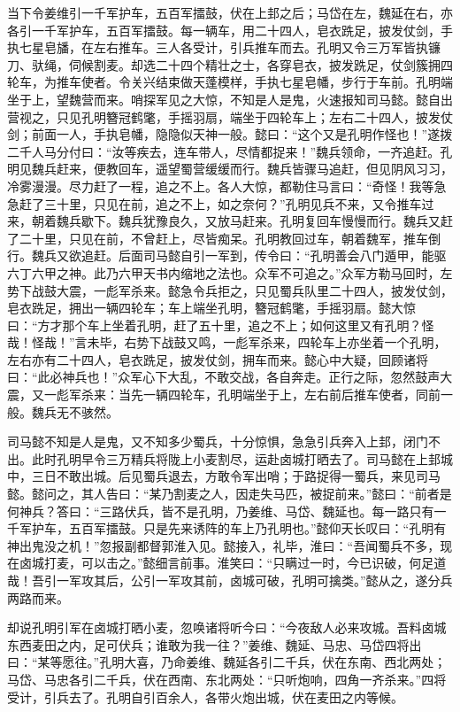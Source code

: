当下令姜维引一千军护车，五百军擂鼓，伏在上邽之后；马岱在左，魏延在右，亦各引一千军护车，五百军擂鼓。每一辆车，用二十四人，皂衣跣足，披发仗剑，手执七星皂旙，在左右推车。三人各受计，引兵推车而去。孔明又令三万军皆执镰刀、驮绳，伺候割麦。却选二十四个精壮之士，各穿皂衣，披发跣足，仗剑簇拥四轮车，为推车使者。令关兴结束做天蓬模样，手执七星皂幡，步行于车前。孔明端坐于上，望魏营而来。哨探军见之大惊，不知是人是鬼，火速报知司马懿。懿自出营视之，只见孔明簪冠鹤氅，手摇羽扇，端坐于四轮车上；左右二十四人，披发仗剑；前面一人，手执皂幡，隐隐似天神一般。懿曰：“这个又是孔明作怪也！”遂拨二千人马分付曰：“汝等疾去，连车带人，尽情都捉来！”魏兵领命，一齐追赶。孔明见魏兵赶来，便教回车，遥望蜀营缓缓而行。魏兵皆骤马追赶，但见阴风习习，冷雾漫漫。尽力赶了一程，追之不上。各人大惊，都勒住马言曰：“奇怪！我等急急赶了三十里，只见在前，追之不上，如之奈何？”孔明见兵不来，又令推车过来，朝着魏兵歇下。魏兵犹豫良久，又放马赶来。孔明复回车慢慢而行。魏兵又赶了二十里，只见在前，不曾赶上，尽皆痴呆。孔明教回过车，朝着魏军，推车倒行。魏兵又欲追赶。后面司马懿自引一军到，传令曰：“孔明善会八门遁甲，能驱六丁六甲之神。此乃六甲天书内缩地之法也。众军不可追之。”众军方勒马回时，左势下战鼓大震，一彪军杀来。懿急令兵拒之，只见蜀兵队里二十四人，披发仗剑，皂衣跣足，拥出一辆四轮车；车上端坐孔明，簪冠鹤氅，手摇羽扇。懿大惊曰：“方才那个车上坐着孔明，赶了五十里，追之不上；如何这里又有孔明？怪哉！怪哉！”言未毕，右势下战鼓又鸣，一彪军杀来，四轮车上亦坐着一个孔明，左右亦有二十四人，皂衣跣足，披发仗剑，拥车而来。懿心中大疑，回顾诸将曰：“此必神兵也！”众军心下大乱，不敢交战，各自奔走。正行之际，忽然鼓声大震，又一彪军杀来：当先一辆四轮车，孔明端坐于上，左右前后推车使者，同前一般。魏兵无不骇然。

司马懿不知是人是鬼，又不知多少蜀兵，十分惊惧，急急引兵奔入上邽，闭门不出。此时孔明早令三万精兵将陇上小麦割尽，运赴卤城打晒去了。司马懿在上邽城中，三日不敢出城。后见蜀兵退去，方敢令军出哨；于路捉得一蜀兵，来见司马懿。懿问之，其人告曰：“某乃割麦之人，因走失马匹，被捉前来。”懿曰：“前者是何神兵？答曰：“三路伏兵，皆不是孔明，乃姜维、马岱、魏延也。每一路只有一千军护车，五百军擂鼓。只是先来诱阵的车上乃孔明也。”懿仰天长叹曰：“孔明有神出鬼没之机！”忽报副都督郭淮入见。懿接入，礼毕，淮曰：“吾闻蜀兵不多，现在卤城打麦，可以击之。”懿细言前事。淮笑曰：“只瞒过一时，今已识破，何足道哉！吾引一军攻其后，公引一军攻其前，卤城可破，孔明可擒类。”懿从之，遂分兵两路而来。

却说孔明引军在卤城打晒小麦，忽唤诸将听今曰：“今夜敌人必来攻城。吾料卤城东西麦田之内，足可伏兵；谁敢为我一往？”姜维、魏延、马忠、马岱四将出曰：“某等愿往。”孔明大喜，乃命姜维、魏延各引二千兵，伏在东南、西北两处；马岱、马忠各引二千兵，伏在西南、东北两处：“只听炮响，四角一齐杀来。”四将受计，引兵去了。孔明自引百余人，各带火炮出城，伏在麦田之内等候。

